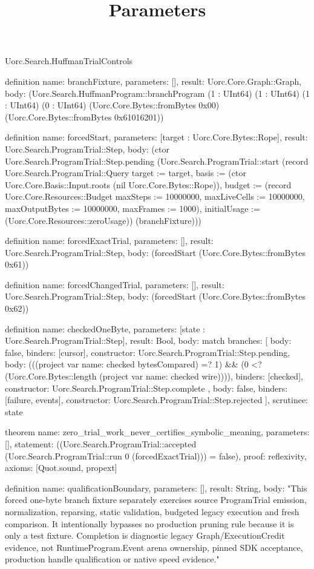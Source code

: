 \begin{lexlean}{Uorc.Search.HuffmanTrialControls}
\title{Parameters}
\begin{semanticmodule}
definition{
  name: branchFixture,
  parameters: [],
  result: Uorc.Core.Graph::Graph,
  body: (Uorc.Search.HuffmanProgram::branchProgram (1 : UInt64) (1 : UInt64) (1 : UInt64) (0 : UInt64) (Uorc.Core.Bytes::fromBytes 0x00) (Uorc.Core.Bytes::fromBytes 0x61016201))
}

definition{
  name: forcedStart,
  parameters: [target : Uorc.Core.Bytes::Rope],
  result: Uorc.Search.ProgramTrial::Step,
  body: (ctor Uorc.Search.ProgramTrial::Step.pending (Uorc.Search.ProgramTrial::start (record Uorc.Search.ProgramTrial::Query {target := target, basis := (ctor Uorc.Core.Basis::Input.roots (nil Uorc.Core.Bytes::Rope)), budget := (record Uorc.Core.Resources::Budget {maxSteps := 10000000, maxLiveCells := 10000000, maxOutputBytes := 10000000, maxFrames := 1000}), initialUsage := (Uorc.Core.Resources::zeroUsage)}) (branchFixture)))
}

definition{
  name: forcedExactTrial,
  parameters: [],
  result: Uorc.Search.ProgramTrial::Step,
  body: (forcedStart (Uorc.Core.Bytes::fromBytes 0x61))
}

definition{
  name: forcedChangedTrial,
  parameters: [],
  result: Uorc.Search.ProgramTrial::Step,
  body: (forcedStart (Uorc.Core.Bytes::fromBytes 0x62))
}

definition{
  name: checkedOneByte,
  parameters: [state : Uorc.Search.ProgramTrial::Step],
  result: Bool,
  body: match{
    branches: [
      {body: false, binders: [cursor], constructor: Uorc.Search.ProgramTrial::Step.pending},
      {
        body: (((project var{
          name: checked
        } bytesCompared) =? 1) && (0 <? (Uorc.Core.Bytes::length (project var{
          name: checked
        } wire)))),
        binders: [checked],
        constructor: Uorc.Search.ProgramTrial::Step.complete
      },
      {
        body: false,
        binders: [failure, events],
        constructor: Uorc.Search.ProgramTrial::Step.rejected
      }
    ],
    scrutinee: state
  }
}

theorem{
  name: zero_trial_work_never_certifies_symbolic_meaning,
  parameters: [],
  statement: ((Uorc.Search.ProgramTrial::accepted (Uorc.Search.ProgramTrial::run 0 (forcedExactTrial))) = false),
  proof: reflexivity{},
  axioms: [Quot.sound, propext]
}

definition{
  name: qualificationBoundary,
  parameters: [],
  result: String,
  body: "This forced one-byte branch fixture separately exercises source ProgramTrial emission, normalization, reparsing, static validation, budgeted legacy execution and fresh comparison. It intentionally bypasses no production pruning rule because it is only a test fixture. Completion is diagnostic legacy Graph/ExecutionCredit evidence, not RuntimeProgram.Event arena ownership, pinned SDK acceptance, production handle qualification or native speed evidence."
}
\end{semanticmodule}
\end{lexlean}
